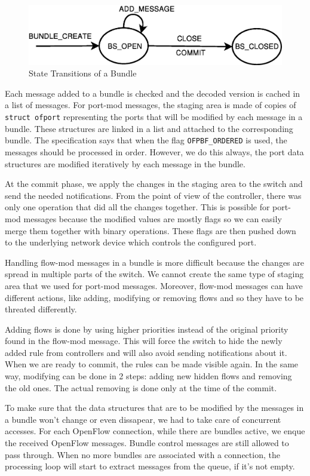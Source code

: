 \begin{figure}[h]
\begin{center}
\includegraphics[scale=0.5]{src/img/bundle-state-machine.eps}
\end{center}
\caption{State Transitions of a Bundle}
\label{fig:bundle-state}
\end{figure}

Each message added to a bundle is checked and the decoded version is cached in a list of messages.
For port-mod messages, the staging area is made of copies of \texttt{struct ofport} representing the ports that
will be modified by each message in a bundle. These structures are linked in a list and attached to the corresponding bundle.
The specification says that when the flag \texttt{OFPBF_ORDERED} is used, the messages should be processed in order.
However, we do this always, the port data structures are modified iteratively by each message in the bundle.

At the commit phase, we apply the changes in the
staging area to the switch and send the needed notifications. From the point of view of the controller, there was only
one operation that did all the changes together. This is possible for port-mod messages because the modified values are mostly
flags so we can easily merge them together with binary operations. These flags are then pushed down to the underlying
network device which controls the configured port.

Handling flow-mod messages in a bundle is more difficult because the changes are spread in multiple parts of the switch.
We cannot create the same type of staging area that we used for port-mod messages. Moreover, flow-mod messages can have
different actions, like adding, modifying or removing flows and so they have to be threated differently.

Adding flows is done by using higher priorities instead of the original priority found in the flow-mod message. This
will force the switch to hide the newly added rule from controllers and will also avoid sending notifications about it.
When we are ready to commit, the rules can be made visible again. In the same way, modifying can be done in 2 steps:
adding new hidden flows and removing the old ones. The actual removing is done only at the time of the commit.

To make sure that the data structures that are to be modified by the messages in a bundle won't change or even dissapear,
we had to take care of concurrent accesses. For each OpenFlow connection, while there are bundles active, we enque the
received OpenFlow messages. Bundle control messages are still allowed to pass through. When no more bundles are associated
with a connection, the processing loop will start to extract messages from the queue, if it's not empty.